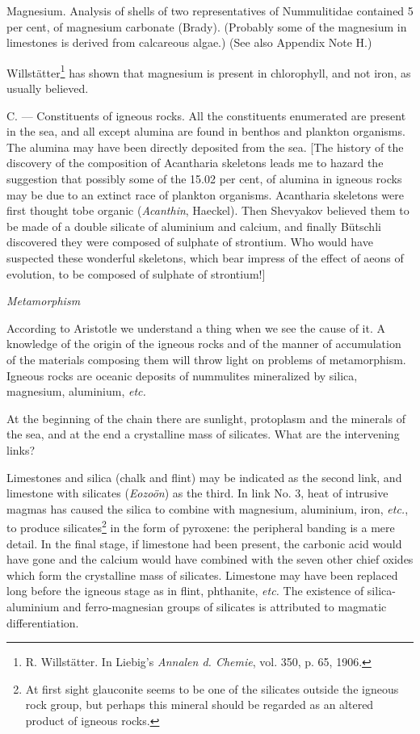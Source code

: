 \documentclass[a4paper, 12pt, oneside]{article}
\begin{document}
Magnesium. Analysis of shells of two representatives of Nummulitidae contained 5 per cent, of magnesium carbonate (Brady). (Probably some of the magnesium in limestones is derived from calcareous algae.) (See also Appendix Note H.)

Willstätter\footnote{R. Willstätter. In Liebig's \emph{Annalen d. Chemie}, vol. 350, p. 65, 1906.} has shown that magnesium is present in chlorophyll, and not iron, as usually believed.

C. --- Constituents of igneous rocks. All the constituents enumerated are present in the sea, and all except alumina are found in benthos and plankton organisms. The alumina may have been directly deposited from the sea. [The history of the discovery of the composition of Acantharia skeletons leads me to hazard the suggestion that possibly some of the 15.02 per cent, of alumina in igneous rocks may be due to an extinct race of plankton organisms. Acantharia skeletons were first thought tobe organic (\emph{Acanthin}, Haeckel). Then Shevyakov believed them to be made of a double silicate of aluminium and calcium, and finally Bütschli discovered they were composed of sulphate of strontium. Who would have suspected these wonderful skeletons, which bear impress of the effect of aeons of evolution, to be composed of sulphate of strontium!]

\bigskip
\centerline{\emph{Metamorphism}}

According to Aristotle we understand a thing when we see the cause of it. A knowledge of the origin of the igneous rocks and of the manner of accumulation of the materials composing them will throw light on problems of metamorphism. Igneous rocks are oceanic deposits of nummulites mineralized by silica, magnesium, aluminium, \emph{etc.}

At the beginning of the chain there are sunlight, protoplasm and the minerals of the sea, and at the end a crystalline mass of silicates. What are the intervening links?

Limestones and silica (chalk and flint) may be indicated as the second link, and limestone with silicates (\emph{Eozoön}) as the third. In link No. 3, heat of intrusive magmas has caused the silica to combine with magnesium, aluminium, iron, \emph{etc.}, to produce silicates\footnote{At first sight glauconite seems to be one of the silicates outside the igneous rock group, but perhaps this mineral should be regarded as an altered product of igneous rocks.} in the form of pyroxene: the peripheral banding is a mere detail. In the final stage, if limestone had been present, the carbonic acid would have gone and the calcium would have combined with the seven other chief oxides which form the crystalline mass of silicates. Limestone may have been replaced long before the igneous stage as in flint, phthanite, \emph{etc.} The existence of silica-aluminium and ferro-magnesian groups of silicates is attributed to magmatic differentiation.
\end{document}
